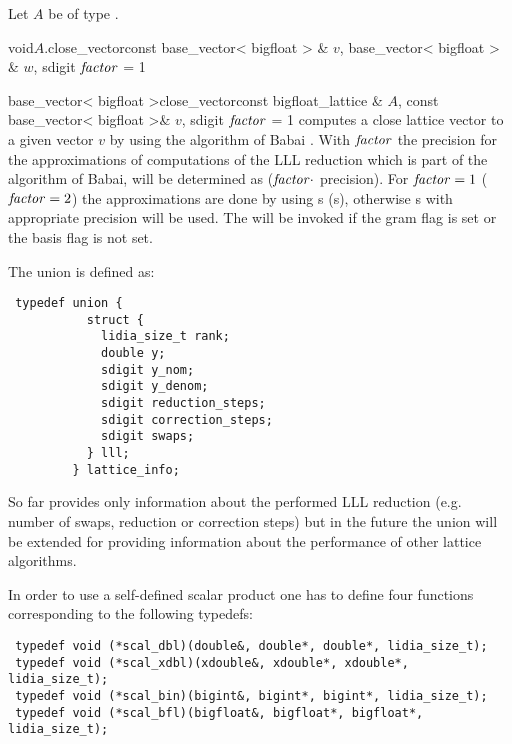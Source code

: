 

Let $A$ be of type .

\begin{fcode}{void}{$A$.close_vector}{const base_vector< bigfloat > & $v$,
    base_vector< bigfloat > & $w$, sdigit $\mathit{factor}$ = 1}%
\end{fcode}

\begin{fcode}{base_vector< bigfloat >}{close_vector}{const bigfloat_lattice & $A$,
    const base_vector< bigfloat >& $v$, sdigit $\mathit{factor}$ = 1}%
  computes a close lattice vector to a given vector $v$ by using the algorithm of Babai
  \cite{Babai:1986}.  With $\mathit{factor}$ the precision for the approximations of computations of the
  LLL reduction which is part of the algorithm of Babai, will be determined as ($\mathit{factor} \cdot$
   precision).  For $\mathit{factor} = 1$ ($\mathit{factor} = 2$) the approximations are done by
  using s (s), otherwise s with appropriate precision
  will be used.  The \LEH will be invoked if the gram flag is set or the basis flag is not set.
\end{fcode}




The union  is defined as:
\begin{verbatim}
 typedef union {
           struct {
             lidia_size_t rank;
             double y;
             sdigit y_nom;
             sdigit y_denom;
             sdigit reduction_steps;
             sdigit correction_steps;
             sdigit swaps;
           } lll;
         } lattice_info;
\end{verbatim}
So far  provides only information about the performed LLL reduction (e.g.
number of swaps, reduction or correction steps) but in the future the union will be extended for
providing information about the performance of other lattice algorithms.

In order to use a self-defined scalar product one has to define four functions corresponding to
the following typedefs:

\begin{verbatim}
 typedef void (*scal_dbl)(double&, double*, double*, lidia_size_t);
 typedef void (*scal_xdbl)(xdouble&, xdouble*, xdouble*, lidia_size_t);
 typedef void (*scal_bin)(bigint&, bigint*, bigint*, lidia_size_t);
 typedef void (*scal_bfl)(bigfloat&, bigfloat*, bigfloat*, lidia_size_t);
\end{verbatim}

